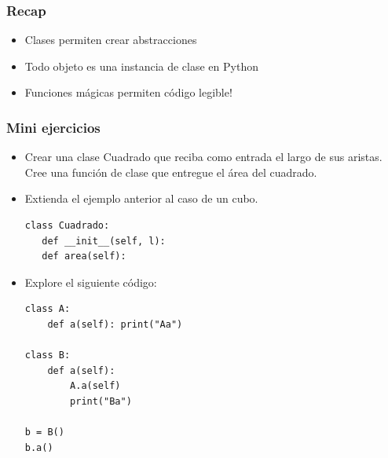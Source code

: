 \documentclass[14pt,aspectratio=169,xcolor=dvipsnames]{beamer}
\begin{document}
\begin{frame}\frametitle{Recap}
    \begin{itemize}
        \item Clases permiten crear abstracciones
        \item Todo objeto es una instancia de clase en Python
        \item Funciones mágicas permiten código legible!
    \end{itemize}
\end{frame}
\begin{frame}
    \maketitle
\end{frame}
\begin{frame}\frametitle{Mini ejercicios}
    \begin{footnotesize}
    \begin{itemize}
        \item Crear una clase Cuadrado que reciba como entrada el largo de sus aristas. Cree una función de clase que entregue el área del cuadrado.
        \item Extienda el ejemplo anterior al caso de un cubo.
    \begin{verbatim}
class Cuadrado:
   def __init__(self, l):
   def area(self):
    \end{verbatim}
        \item Explore el siguiente código:
    \begin{verbatim}
class A:
    def a(self): print("Aa")

class B:
    def a(self):
        A.a(self)
        print("Ba")

b = B()
b.a()
        \end{verbatim}
    \end{itemize}
    \end{footnotesize}
\end{frame}
\end{document}
